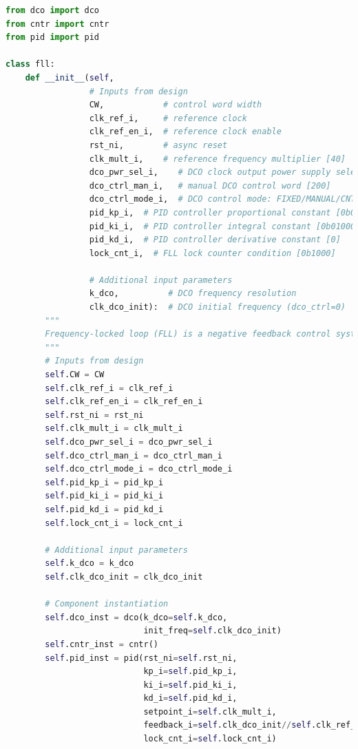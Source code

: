 \documentclass[master]{finthesis}
\def \FLL  {FLL} %
\begin{document}
\begin{lstlisting}[language=Python, caption={Имплементација модела \FLL\ компоненте.}, label={lst:py:fll}]
from dco import dco
from cntr import cntr
from pid import pid

class fll:
    def __init__(self,
                 # Inputs from design
                 CW,            # control word width
                 clk_ref_i,     # reference clock
                 clk_ref_en_i,  # reference clock enable
                 rst_ni,        # async reset
                 clk_mult_i,    # reference frequency multiplier [40]
                 dco_pwr_sel_i,    # DCO clock output power supply selection: VDDL/VDD [0/1]
                 dco_ctrl_man_i,   # manual DCO control word [200]
                 dco_ctrl_mode_i,  # DCO control mode: FIXED/MANUAL/CNT/PID [PID=3/CNT=2]
                 pid_kp_i,  # PID controller proportional constant [0b01000000]
                 pid_ki_i,  # PID controller integral constant [0b01000000]
                 pid_kd_i,  # PID controller derivative constant [0]
                 lock_cnt_i,  # FLL lock counter condition [0b1000]

                 # Additional input parameters
                 k_dco,          # DCO frequency resolution
                 clk_dco_init):  # DCO initial frequency (dco_ctrl=0) 
        """
        Frequency-locked loop (FLL) is a negative feedback control system that locks the output frequency signal to the target frequency. Principally, it continuously controls the oscillator frequency in an automated way until its output frequency matches the target value, after which that value is maintained at the output.
        """
        # Inputs from design
        self.CW = CW
        self.clk_ref_i = clk_ref_i 
        self.clk_ref_en_i = clk_ref_en_i
        self.rst_ni = rst_ni
        self.clk_mult_i = clk_mult_i
        self.dco_pwr_sel_i = dco_pwr_sel_i  
        self.dco_ctrl_man_i = dco_ctrl_man_i
        self.dco_ctrl_mode_i = dco_ctrl_mode_i 
        self.pid_kp_i = pid_kp_i
        self.pid_ki_i = pid_ki_i
        self.pid_kd_i = pid_kd_i
        self.lock_cnt_i = lock_cnt_i

        # Additional input parameters
        self.k_dco = k_dco
        self.clk_dco_init = clk_dco_init

        # Component instantiation
        self.dco_inst = dco(k_dco=self.k_dco,
                            init_freq=self.clk_dco_init)
        self.cntr_inst = cntr()
        self.pid_inst = pid(rst_ni=self.rst_ni,
                            kp_i=self.pid_kp_i,
                            ki_i=self.pid_ki_i,
                            kd_i=self.pid_kd_i,
                            setpoint_i=self.clk_mult_i,
                            feedback_i=self.clk_dco_init//self.clk_ref_i,
                            lock_cnt_i=self.lock_cnt_i)


\end{lstlisting}
\end{document}
